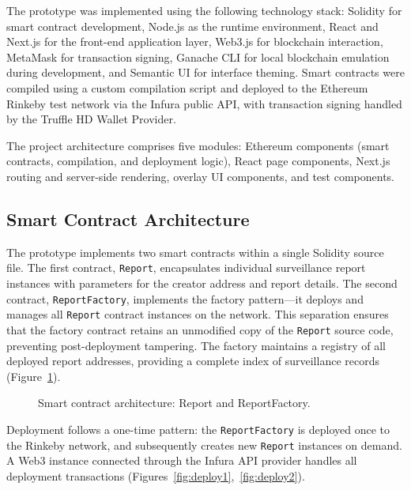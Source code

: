\documentclass[AMA,LATO1COL]{WileyNJD-v2}
\begin{document}
The prototype was implemented using the following technology stack: Solidity for smart contract development, Node.js as the runtime environment, React and Next.js for the front-end application layer, Web3.js for blockchain interaction, MetaMask for transaction signing, Ganache CLI for local blockchain emulation during development, and Semantic UI for interface theming. Smart contracts were compiled using a custom compilation script and deployed to the Ethereum Rinkeby test network via the Infura public API, with transaction signing handled by the Truffle HD Wallet Provider.

The project architecture comprises five modules: Ethereum components (smart contracts, compilation, and deployment logic), React page components, Next.js routing and server-side rendering, overlay UI components, and test components.

\subsection{Smart Contract Architecture}\label{subsec:contracts}

The prototype implements two smart contracts within a single Solidity source file. The first contract, \texttt{Report}, encapsulates individual surveillance report instances with parameters for the creator address and report details. The second contract, \texttt{ReportFactory}, implements the factory pattern---it deploys and manages all \texttt{Report} contract instances on the network. This separation ensures that the factory contract retains an unmodified copy of the \texttt{Report} source code, preventing post-deployment tampering. The factory maintains a registry of all deployed report addresses, providing a complete index of surveillance records (Figure~\ref{fig:contracts}).

\begin{figure}[!ht]
\centering
{}
\caption{Smart contract architecture: Report and ReportFactory.}\label{fig:contracts}
\end{figure}

Deployment follows a one-time pattern: the \texttt{ReportFactory} is deployed once to the Rinkeby network, and subsequently creates new \texttt{Report} instances on demand. A Web3 instance connected through the Infura API provider handles all deployment transactions (Figures~\ref{fig:deploy1},~\ref{fig:deploy2}).
\end{document}
